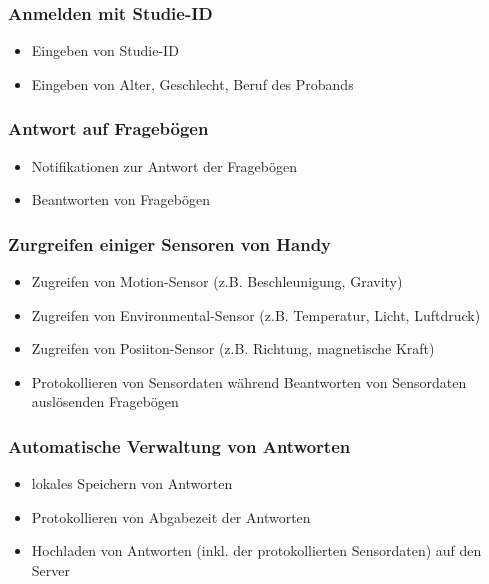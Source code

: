 \documentclass[a4paper]{scrreprt}
\begin{document}
                \subsubsection{Anmelden mit Studie-ID}
                    \begin{itemize}
                        \item Eingeben von Studie-ID
                        \item Eingeben von Alter, Geschlecht, Beruf des Probands
                    \end{itemize}

                \subsubsection{Antwort auf Frageb\"ogen}
                    \begin{itemize}
                        \item Notifikationen zur Antwort der Frageb\"ogen
                        \item Beantworten von Frageb\"ogen
                    \end{itemize}

                \subsubsection{Zurgreifen einiger Sensoren von Handy}
                    \begin{itemize}
                        \item Zugreifen von Motion-Sensor (z.B. Beschleunigung, Gravity)
                        \item Zugreifen von Environmental-Sensor (z.B. Temperatur, Licht, Luftdruck)
                        \item Zugreifen von Posiiton-Sensor (z.B. Richtung, magnetische Kraft)
                        \item Protokollieren von Sensordaten w\"ahrend Beantworten von Sensordaten auslösenden Frageb\"ogen
                    \end{itemize}

                \subsubsection{Automatische Verwaltung von Antworten}
                    \begin{itemize}
                        \item lokales Speichern von Antworten
                        \item Protokollieren von Abgabezeit der Antworten
                        \item Hochladen von Antworten (inkl. der protokollierten Sensordaten) auf den Server
                    \end{itemize}
\end{document}

